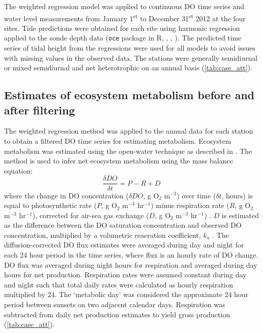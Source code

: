 \documentclass[letterpaper,12pt,oneside]{article}\usepackage[]{graphicx}\usepackage[]{color}
\begin{document}
The weighted regression model was applied to continuous \ac{DO} time series and water level measurements from January 1\textsuperscript{st} to December 31\textsuperscript{st} 2012 at the four sites.  Tide predictions were obtained for each site using harmonic regression applied to the sonde depth data (\texttt{oce} package in R, \citealt{Foreman89}, \citealt{Kelley14}, ). The predicted time series of tidal height from the regressions were used for all models to avoid issues with missing values in the observed data. The stations were generally semidiurnal or mixed semidiurnal and net heterotrophic on an annual basis (\cref{tab:case_att}).

\subsection{Estimates of ecosystem metabolism before and after filtering} \label{met_sec}

The weighted regression method was applied to the annual data for each station to obtain a filtered \ac{DO} time series for estimating metabolism.  Ecosystem metabolism was estimated using the open-water technique \citep{Odum56} as described in \citet{Caffrey14}.  The method is used to infer net ecosystem metabolism using the mass balance equation:
\begin{equation} \label{metrate}
\frac{\delta DO}{\delta t} = P - R + D
\end{equation}
where the change in \ac{DO} concentration ($\delta DO$, g O$_2$ m$^{-3}$) over time ($\delta t$, hours) is equal to photosynthetic rate ($P$, g O$_2$ m$^{-3}$ hr$^{-1}$) minus respiration rate ($R$, g O$_2$ m$^{-3}$ hr$^{-1}$), corrected for air-sea gas exchange ($D$, g O$_2$ m$^{-3}$ hr$^{-1}$) \citep{Caffrey14}. $D$ is estimated as the difference between the \ac{DO} saturation concentration and observed \ac{DO} concentration, multiplied by a volumetric reaeration coefficient, $k_a$ \citep{Thebault08}.  The diffusion-corrected \ac{DO} flux estimates were averaged during day and night for each 24 hour period in the time series, where flux is an hourly rate of \ac{DO} change. \ac{DO} flux was averaged during night hours for respiration and averaged during day hours for net production. Respiration rates were assumed constant during day and night such that total daily rates were calculated as hourly respiration multiplied by 24. The `metabolic day' was considered the approximate 24 hour period between sunsets on two adjacent calendar days.  Respiration was subtracted from daily net production estimates to yield gross production (\cref{tab:case_att}).  
\end{document}
